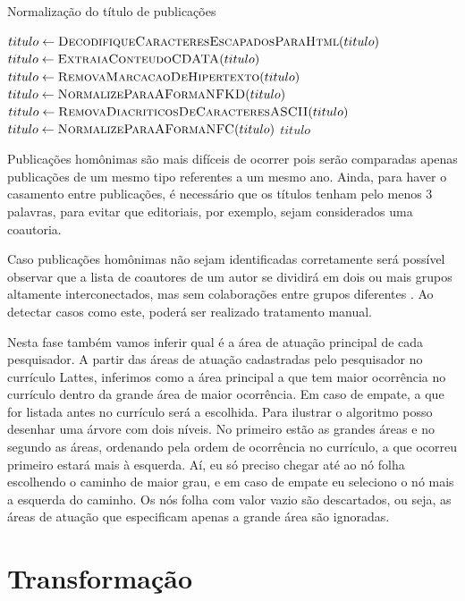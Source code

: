\begin{algorithm}
\caption{Normalização do título de publicações}
\label{alg:normalizacao}
\begin{algorithmic}[1]

\State $titulo\gets \Call{DecodifiqueCaracteresEscapadosParaHtml}{titulo}$
\State $titulo\gets \Call{ExtraiaConteudoCDATA}{titulo}$
\State $titulo\gets \Call{RemovaMarcacaoDeHipertexto}{titulo}$
\State $titulo\gets \Call{NormalizeParaAFormaNFKD}{titulo}$
\State $titulo\gets \Call{RemovaDiacriticosDeCaracteresASCII}{titulo}$
\State $titulo\gets \Call{NormalizeParaAFormaNFC}{titulo}$
\State \Return $titulo$
\EndProcedure

\end{algorithmic}
\end{algorithm}

Publicações homônimas são mais difíceis de ocorrer pois serão comparadas apenas publicações de um mesmo tipo referentes a um mesmo ano. Ainda, para haver o casamento entre publicações, é necessário que os títulos tenham pelo menos 3 palavras, para evitar que editoriais, por exemplo, sejam considerados uma coautoria.

Caso publicações homônimas não sejam identificadas corretamente será possível observar que a lista de coautores de um autor se dividirá em dois ou mais grupos altamente interconectados, mas sem colaborações entre grupos diferentes \cite{franceschet2011collaboration}. Ao detectar casos como este, poderá ser realizado tratamento manual.

Nesta fase também vamos inferir qual é a área de atuação principal de cada pesquisador. A partir das áreas de atuação cadastradas pelo pesquisador no currículo Lattes, inferimos como a área principal a que tem maior ocorrência no currículo dentro da grande área de maior ocorrência. Em caso de empate, a que for listada antes no currículo será a escolhida. Para ilustrar o algoritmo posso desenhar uma árvore com dois níveis. No primeiro estão as grandes áreas e no segundo as áreas, ordenando pela ordem de ocorrência no currículo, a que ocorreu primeiro estará mais à esquerda. Aí, eu só preciso chegar até ao nó folha escolhendo o caminho de maior grau, e em caso de empate eu seleciono o nó mais a esquerda do caminho. Os nós folha com valor vazio são descartados, ou seja, as áreas de atuação que especificam apenas a grande área são ignoradas.

\section{Transformação}


